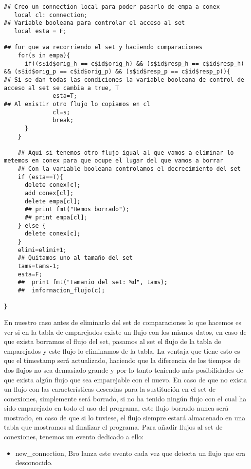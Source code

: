 \begin{lstlisting}[style=CodigoC]
## Creo un connection local para poder pasarlo de empa a conex
   local cl: connection;
## Variable booleana para controlar el acceso al set
   local esta = F;

## for que va recorriendo el set y haciendo comparaciones
    for(s in empa){
      if((s$id$orig_h == c$id$orig_h) && (s$id$resp_h == c$id$resp_h) && (s$id$orig_p == c$id$orig_p) && (s$id$resp_p == c$id$resp_p)){
## Si se dan todas las condiciones la variable booleana de control de acceso al set se cambia a true, T
              esta=T;
## Al existir otro flujo lo copiamos en cl
              cl=s;
              break;
      }
    }

    ## Aqui si tenemos otro flujo igual al que vamos a eliminar lo metemos en conex para que ocupe el lugar del que vamos a borrar
    ## Con la variable booleana controlamos el decrecimiento del set
    if (esta==T){
      delete conex[c];
      add conex[cl];
      delete empa[cl];
      ## print fmt("Hemos borrado");
      ## print empa[cl];
    } else {
      delete conex[c];
    }
    elimi=elimi+1;
    ## Quitamos uno al tamaño del set
    tams=tams-1;
    esta=F;
    ##  print fmt("Tamanio del set: %d", tams);
    ##  informacion_flujo(c);

}
\end{lstlisting}

En nuestro caso antes de eliminarlo del set de comparaciones 
lo que hacemos es ver si en la tabla de emparejados existe un 
flujo con los mismos datos, en caso de que exista borramos el 
flujo del set, pasamos al set el flujo de la tabla de emparejados 
y este flujo lo eliminamos de la tabla. La ventaja que tiene 
esto es que el timestamp será actualizado, haciendo que la 
diferencia de los tiempos de dos flujos no sea demasiado grande 
y por lo tanto teniendo más posibilidades de que exista algún 
flujo que sea emparejable con el nuevo. En caso de que no exista 
un flujo con las características deseadas para la sustitución en 
el set de conexiones, simplemente será borrado, si no ha tenido 
ningún flujo con el cual ha sido emparejado en todo el uso del 
programa, este flujo borrado nunca será mostrado, en caso de que 
si lo tuviese, el flujo siempre estará almacenado en una tabla 
que mostramos al finalizar el programa.
\intro
Para añadir flujos al set de conexiones, tenemos un evento 
dedicado a ello:
\intro
\begin{itemize}
\item new\_connection, Bro lanza este evento cada vez que detecta un flujo que era desconocido.
\end{itemize}

